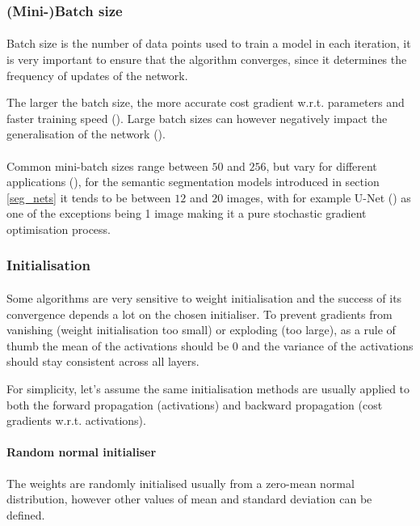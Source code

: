 \subsubsection{(Mini-)Batch size} \label{batch_size}
\paragraph{}
Batch size is the number of data points used to train a model in each iteration, it is very important to ensure that the algorithm converges, since it determines the frequency of updates of the network.


The larger the batch size, the more accurate cost gradient w.r.t. parameters and faster training speed (\cite{deeplearning_ai}). Large batch sizes can however negatively impact the generalisation of the network (\cite{keskar2017largebatch}).

\paragraph{}
Common mini-batch sizes range between $50$ and $256$, but vary for different applications (\cite{ruder2017overview}), for the semantic segmentation models introduced in section \ref{seg_nets} it tends to be between $12$ and $20$ images, with for example U-Net (\cite{ronneberger2015unet}) as one of the exceptions being 1 image making it a pure stochastic gradient optimisation process.

\subsubsection{Initialisation} \label{initialisation}
\paragraph{}
Some algorithms are very sensitive to weight initialisation and the success of its convergence depends a lot on the chosen initialiser. To prevent gradients from vanishing (weight initialisation too small) or exploding (too large), as a rule of thumb the mean of the activations should be $0$ and the variance of the activations should stay consistent across all layers.

For simplicity, let's assume the same initialisation methods are usually applied to both the forward propagation (activations) and backward propagation (cost gradients \gls{w.r.t.} activations).

\paragraph{Random normal initialiser} The weights are randomly initialised usually from a zero-mean normal distribution, however other values of mean and standard deviation can be defined. 

